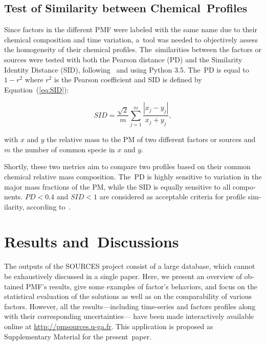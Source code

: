 \begin{otherlanguage}{english}
\subsection{Test of Similarity between Chemical~Profiles}%
\label{sub:test_of_similarity_between_chemical_profiles}

Since factors in the different PMF were labeled with the same name due to their chemical
composition and time variation, a~tool was needed to objectively assess the homogeneity of
their chemical profiles. The~similarities between the factors or sources were tested with
both the Pearson distance (PD) and the Similarity Identity Distance (SID),
following~\textcite{belisNew2015} and using Python 3.5. The~PD is equal to $1-r^2$ where
$r^2$ is the Pearson coefficient and SID is defined by Equation~(\ref{eq:SID}):

\begin{equation}
    \label{eq:SID}
    SID = \frac{\sqrt{2}}{m} \sum_{j=1}^m \frac{|x_j - y_j|}{x_j+y_j},
\end{equation}

with $x$ and $y$ the relative mass to the PM of  two different factors or sources and $m$
the number of common specie in $x$ and $y$.

Shortly, these two metrics aim to compare  two  profiles based on their common chemical
relative mass composition. The~PD is highly sensitive to variation in the major mass
fractions of the PM, while the SID is equally sensitive to all components. $PD < 0.4$ and
$SID < 1$ are considered as acceptable criteria for profile similarity, according
to~\textcite{pernigottiDeltaSA2018}.

\section{Results and~Discussions}%
\label{sec:results_and_discussions}

The outputs of the SOURCES project consist of a large database, which cannot be
exhaustively discussed in a single paper. Here, we present an overview of obtained PMF's
results, give some examples of factor's behaviors, and focus on the statistical evaluation
of the solutions as well as on the comparability of various factors. However, all the
results---including time-series and factors profiles along with their corresponding
uncertainties--- have been made interactively available online at
\url{http://pmsources.u-ga.fr}. This application is proposed as Supplementary Material for
the present~paper.  


\end{otherlanguage}
